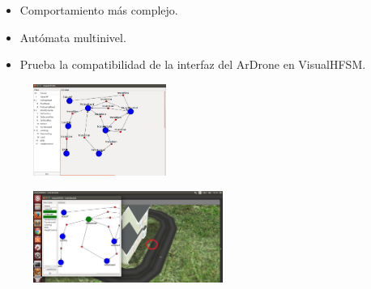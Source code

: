 \documentclass[notes,slidesec,a4]{seminar}
\begin{document}

\begin{hslide}

\begin{itemize}
\item Comportamiento más complejo.
\item Autómata multinivel.
\item Prueba la compatibilidad de la interfaz del ArDrone en VisualHFSM.
\end{itemize}

\begin{center}
\begin{minipage}[t]{0.45\textwidth}
	\begin{figure}
		\includegraphics[height=3cm]{imgs/monitorArea.png}
	\end{figure}
\end{minipage}
\begin{minipage}[t]{0.45\textwidth}
	\begin{figure}
		\includegraphics[height=3cm]{imgs/followingRoad.png}
	\end{figure}
\end{minipage}
\end{center}

\end{hslide}


\end{document}
